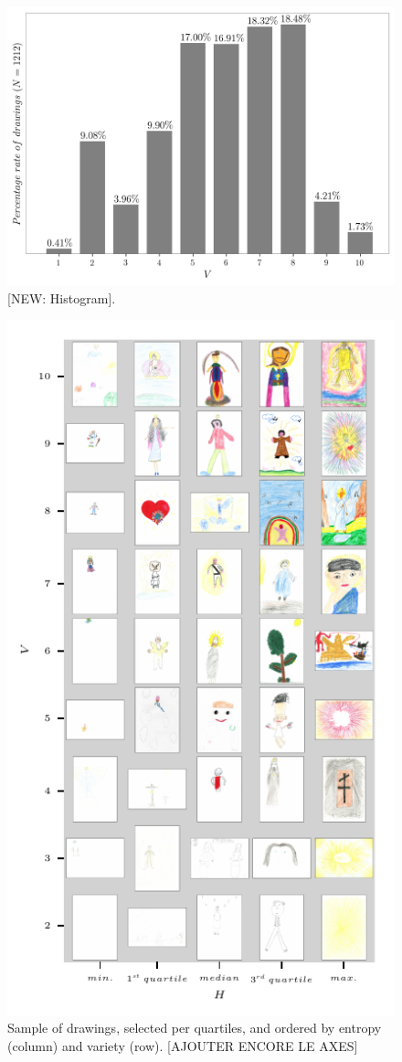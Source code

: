 \documentclass[11pt,a4paper]{article}
\begin{document}
\begin{figure}[h!]
	\centering
	\includegraphics[width=\linewidth]{figures/colors-boxplot-hist.png}
	\caption{{\color{red}[NEW: Histogram]}.}
	\label{fig:boxplotvariety}
\end{figure}

\begin{figure}
	\centering
	\includegraphics[width=0.75\linewidth]{figures/colors-grille.pdf}
	\caption{Sample of drawings, selected per quartiles, and ordered by entropy (column) and variety (row). {\color{red}[AJOUTER ENCORE LE AXES]}}
	\label{fig:grille}
\end{figure}
\end{document}
